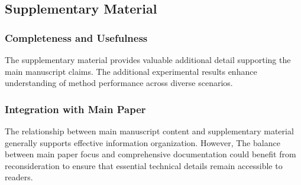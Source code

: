 \subsection{Supplementary Material}
\subsubsection{Completeness and Usefulness}
The supplementary material provides valuable additional detail supporting the main manuscript claims.  The additional experimental results enhance understanding of method performance across diverse scenarios.

\subsubsection{Integration with Main Paper}
The relationship between main manuscript content and supplementary material generally supports effective information organization. However,  The balance between main paper focus and comprehensive documentation could benefit from reconsideration to ensure that essential technical details remain accessible to readers.
